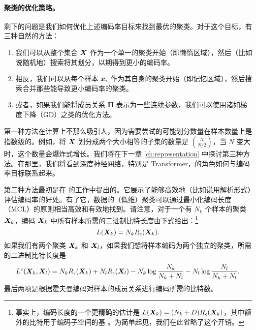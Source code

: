 \documentclass[../../book-main_zh.tex]{subfiles}
\begin{document}
\paragraph{聚类的优化策略。}
剩下的问题是我们如何优化上述编码率目标来找到最优的聚类。对于这个目标，有三种自然的方法：
\begin{enumerate}
	\item 我们可以从整个集合 $\bm{X}$ 作为一个单一的聚类开始（即懒惰区域），然后（比如说随机地）搜索将其划分，以期得到更小的编码率。
	\item 相反，我们可以从每个样本 $\bm{x}_i$ 作为其自身的聚类开始（即记忆区域），然后搜索合并那些能导致更小编码率的聚类。
	\item 或者，如果我们能将成员关系 $\boldsymbol{\Pi}$ 表示为一些连续参数，我们可以使用诸如梯度下降（GD）之类的优化方法。
\end{enumerate}
第一种方法在计算上不那么吸引人，因为需要尝试的可能划分数量在样本数量上是指数级的。例如，将 $\bm{X}$ 划分成两个大小相等的子集的数量是 $N \choose N/2$，当 $N$ 变大时，这个数量会爆炸式增长。我们将在下一章 \ref{ch:representation} 中探讨第三种方法。在那里，我们将看到深度神经网络，特别是 Transformer，的角色如何与编码率目标联系起来。



第二种方法最初是在 \cite{ma2007segmentation} 的工作中提出的。它展示了能够高效地（比如说用解析形式）评估编码率的好处。有了它，数据的（低维）聚类可以通过最小化编码长度（MCL）的原则相当高效和有效地找到。请注意，对于一个有 $N_k$ 个样本的聚类 $\bm{X}_k$，编码 $\bm{X}_k$ 中所有样本所需的二进制比特长度由下式给出：\footnote{事实上，编码长度的一个更精确的估计是 $L(\bm{X}_k) = (N_k+D) R_\epsilon(\bm{X}_k)$，其中额外的比特用于编码子空间的基 \cite{ma2007segmentation}。为简单起见，我们在此省略了这个开销。}
\begin{equation}
	L(\bm{X}_k) = N_k R_\epsilon(\bm{X}_k).
\end{equation}
如果我们有两个聚类 $\bm{X}_k$ 和 $\bm{X}_l$，如果我们想将样本编码为两个独立的聚类，所需的二进制比特长度是
\begin{equation*}
	L^c(\bm{X}_k, \bm{X}_l) = N_k R_\epsilon(\bm{X}_k) + N_l R_\epsilon(\bm{X}_l) - N_k \log\frac{N_k}{N_k + N_l} - N_l \log\frac{N_l}{N_k + N_l}.
\end{equation*}
最后两项是根据霍夫曼编码对样本的成员关系进行编码所需的比特数。
\end{document}
